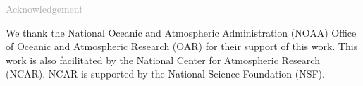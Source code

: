 \begin{titlepage}
\vspace*{0.5cm}
\noindent

\begin{flushleft}
\textcolor{darkgray}{\LARGE Acknowledgement}
\vspace*{1cm}\par

We thank the National Oceanic and Atmospheric Administration (NOAA) Office of Oceanic and Atmospheric Research (OAR) for their support of this work. This work is also facilitated by the National Center for Atmospheric Research (NCAR). NCAR is supported by the National Science Foundation (NSF).

\end{flushleft}
\end{titlepage}
\pagebreak{}




